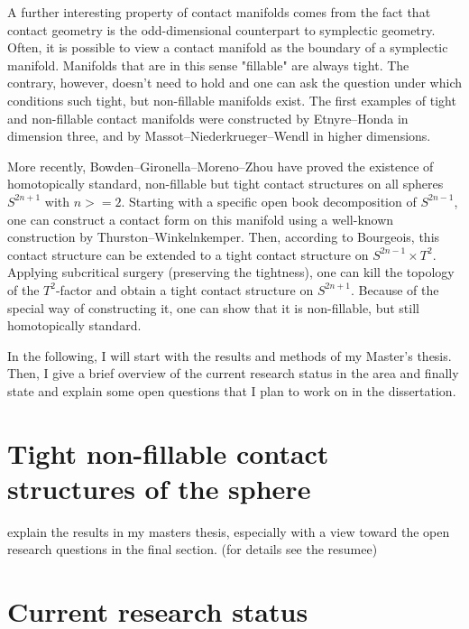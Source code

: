 \documentclass{amsart}
\begin{document}
A further interesting property of contact manifolds comes from the fact that contact geometry is the odd-dimensional counterpart to symplectic geometry. Often, it is possible to view a contact manifold as the boundary of a symplectic manifold. Manifolds that are in this sense "fillable" are always tight. The contrary, however, doesn't need to hold and one can ask the question under which conditions such tight, but non-fillable manifolds exist. The first examples of tight and non-fillable contact manifolds were constructed by Etnyre--Honda \cite{EH02} in dimension three, and by Massot--Niederkrueger--Wendl \cite{MNW13} in higher dimensions.


More recently, Bowden--Gironella--Moreno--Zhou \cite{BGMZ22} have proved the existence of homotopically standard, non-fillable but tight contact structures on all spheres $S^{2n+1}$ with $n >= 2$. Starting with a specific open book decomposition of $S^{2n-1}$, one can construct a contact form on this manifold using a well-known construction by Thurston--Winkelnkemper. Then, according to Bourgeois, this contact structure can be extended to a tight contact structure on $S^{2n-1}\times T^2$.
Applying subcritical surgery (preserving the tightness), one can kill the topology of the $T^2$-factor and obtain a tight contact structure on $S^{2n+1}$. Because of the special way of constructing it, one can show that it is non-fillable, but still homotopically standard.

In the following, I will start with the results and methods of my Master's thesis.
Then, I give a brief overview of the current research status in the area and
finally state and explain some open questions that I plan to work on in the dissertation.

\section*{Tight non-fillable contact structures of the sphere}
explain the results in my masters thesis, especially with a view toward the open research questions in the final section. (for details see the resumee)
\section*{Current research status}
\end{document}
